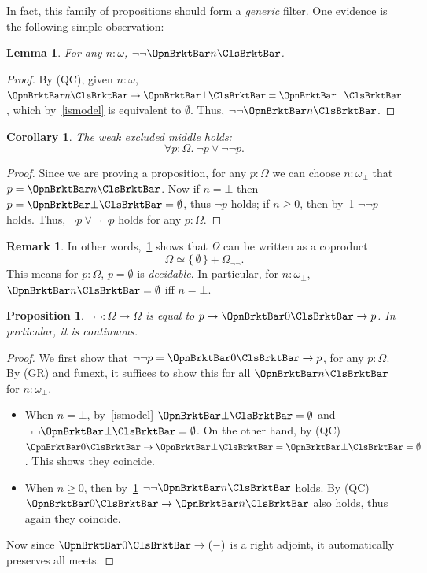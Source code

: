 \documentclass[a4paper,10pt]{amsart}
\newtheorem{lemma}{Lemma}[section]
\newtheorem{corollary}{Corollary}[section]
\newtheorem{proposition}{Proposition}[section]
\theoremstyle{definition}
\newtheorem{remark}{Remark}[section]
\newcommand{\set}[1]{\{\,#1\,\}}
\newcommand{\fa}[2]{\forall #1 \!:\! #2.\ }
\newcommand{\emp}{\emptyset}
\newcommand{\ass}[1]{\OpnBrktBar#1\ClsBrktBar}
\newcommand{\ovob}{\omega_\bot}
\newcommand{\Prop}{\Omega}
\begin{document}
In fact, this family of propositions should form a \emph{generic} filter. One evidence is the following simple observation:

\begin{lemma}\label{dnegclose}
  For any $n:\omega$, $\neg\neg\ass n$.
\end{lemma}
\begin{proof}
  By (QC), given $n:\omega$, $\ass n \to \ass\bot = \ass\bot$, which by~\cref{ismodel} is equivalent to $\emp$. Thus, $\neg\neg\ass n$.
\end{proof}

\begin{corollary}\label{wlem}
  The weak excluded middle holds:
  \[ \fa p{\Prop} \neg p \vee \neg\neg p. \]
\end{corollary}
\begin{proof}
  Since we are proving a proposition, for any $p:\Prop$ we can choose $n:\ovob$ that $p = \ass n$. Now if $n = \bot$ then $p = \ass\bot = \emp$, thus $\neg p$ holds; if $n \ge 0$, then by~\cref{dnegclose} $\neg\neg p$ holds. Thus, $\neg p \vee \neg\neg p$ holds for any $p:\Prop$.
\end{proof}

\begin{remark}\label{empdecidable}
  In other words,~\cref{wlem} shows that $\Prop$ can be written as a coproduct
  \[ \Prop \simeq \set{\emp} + \Prop_{\neg\neg}. \]
  This means for $p:\Omega$, $p = \emp$ is \emph{decidable}. In particular, for $n:\ovob$, $\ass n = \emp$ iff $n = \bot$.
\end{remark}

\begin{proposition}\label{doubleneg}
  $\neg\neg \colon \Prop \to \Prop$ is equal to $p \mapsto \ass0 \to p$. In particular, it is continuous.
\end{proposition}
\begin{proof}
  We first show that $\neg\neg p = \ass 0 \to p$, for any $p:\Prop$. By (GR) and funext, it suffices to show this for all $\ass n$ for $n:\ovob$. 
  \begin{itemize}
    \item When $n = \bot$, by~\cref{ismodel} $\ass\bot = \emp$ and $\neg\neg\ass\bot = \emp$. On the other hand, by (QC) $\ass0 \to \ass\bot=\ass\bot = \emp$. This shows they coincide.
    \item When $n\ge 0$, then by~\cref{dnegclose} $\neg\neg\ass n$ holds. By (QC) $\ass0 \to \ass n$ also holds, thus again they coincide.
  \end{itemize}
  Now since $\ass0 \to (-)$ is a right adjoint, it automatically preserves all meets.
\end{proof}
\end{document}
